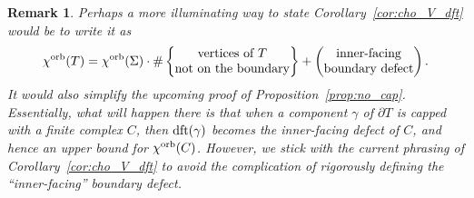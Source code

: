 \documentclass{amsart}
\newtheorem{remark}[conjecture]{Remark}
\newcommand{\cho}{\chi^{\textnormal{orb}}}
\newcommand{\dft}{\textnormal{dft}}
\begin{document}
\begin{remark}\label{rmk:inner_dft}
Perhaps a more illuminating way to state Corollary~\ref{cor:cho_V_dft} would be to write it as
\begin{equation*}
\cho(T)=\cho(\Sigma)\cdot\#\left\{\begin{matrix}\text{vertices of }T\\\text{not on the boundary}\end{matrix}\right\}+\left(\begin{matrix}\text{inner-facing}\\\text{boundary defect}\end{matrix}\right).
\end{equation*}
It would also simplify the upcoming proof of Proposition~\ref{prop:no_cap}. Essentially, what will happen there is that when a component $\gamma$ of $\partial T$ is capped with a finite complex $C$, then $\dft(\gamma)$ becomes the inner-facing defect of $C$, and hence an upper bound for $\cho(C)$. However, we stick with the current phrasing of Corollary~\ref{cor:cho_V_dft} to avoid the complication of rigorously defining the ``inner-facing'' boundary defect.
\end{remark}
\end{document}
